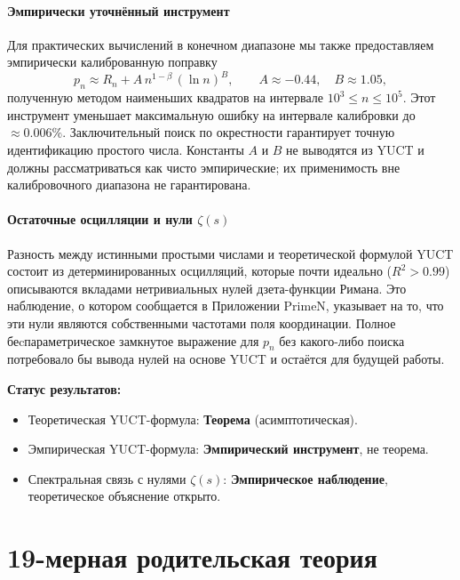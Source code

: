 \documentclass[11pt,a4paper]{article}
\begin{document}
	\subsection{Эмпирически уточнённый инструмент}
	
	Для практических вычислений в конечном диапазоне мы также предоставляем эмпирически калиброванную поправку
	\[
	p_n \approx R_n + A\, n^{1-\beta}\,(\ln n)^B,
	\qquad A \approx -0.44,\quad B \approx 1.05,
	\]
	полученную методом наименьших квадратов на интервале \(10^3\le n\le 10^5\). Этот инструмент уменьшает максимальную ошибку на интервале калибровки до \(\approx 0.006\%\). Заключительный поиск по окрестности гарантирует точную идентификацию простого числа. Константы \(A\) и \(B\) не выводятся из YUCT и должны рассматриваться как чисто эмпирические; их применимость вне калибровочного диапазона не гарантирована.
	
	\subsection{Остаточные осцилляции и нули \(\zeta(s)\)}
	
	Разность между истинными простыми числами и теоретической формулой YUCT состоит из детерминированных осцилляций, которые почти идеально (\(R^2>0.99\)) описываются вкладами нетривиальных нулей дзета-функции Римана. Это наблюдение, о котором сообщается в Приложении PrimeN, указывает на то, что эти нули являются собственными частотами поля координации. Полное беcпараметрическое замкнутое выражение для \(p_n\) без какого-либо поиска потребовало бы вывода нулей на основе YUCT и остаётся для будущей работы.
	
	\textbf{Статус результатов:}
	\begin{itemize}
		\item Теоретическая YUCT-формула: \textbf{Теорема} (асимптотическая).
		\item Эмпирическая YUCT-формула: \textbf{Эмпирический инструмент}, не теорема.
		\item Спектральная связь с нулями \(\zeta(s)\): \textbf{Эмпирическое наблюдение}, теоретическое объяснение открыто.
	\end{itemize}
	
	\part{19-мерная родительская теория}
	
\end{document}
